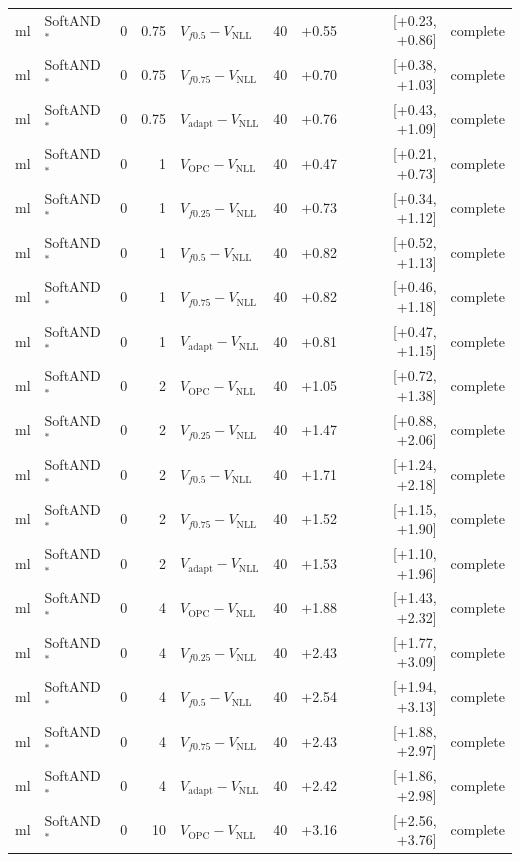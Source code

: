 \documentclass[10pt,a4paper]{article}
\begin{document}
{\begin{longtable}{llrrlrrrl}
ml & SoftAND$^*$ & 0 & 0.75 & $V_{f0.5}-V_{\mathrm{NLL}}$ & 40 & +0.55 & [+0.23, +0.86] & complete \\
ml & SoftAND$^*$ & 0 & 0.75 & $V_{f0.75}-V_{\mathrm{NLL}}$ & 40 & +0.70 & [+0.38, +1.03] & complete \\
ml & SoftAND$^*$ & 0 & 0.75 & $V_{\mathrm{adapt}}-V_{\mathrm{NLL}}$ & 40 & +0.76 & [+0.43, +1.09] & complete \\
ml & SoftAND$^*$ & 0 & 1 & $V_{\mathrm{OPC}}-V_{\mathrm{NLL}}$ & 40 & +0.47 & [+0.21, +0.73] & complete \\
ml & SoftAND$^*$ & 0 & 1 & $V_{f0.25}-V_{\mathrm{NLL}}$ & 40 & +0.73 & [+0.34, +1.12] & complete \\
ml & SoftAND$^*$ & 0 & 1 & $V_{f0.5}-V_{\mathrm{NLL}}$ & 40 & +0.82 & [+0.52, +1.13] & complete \\
ml & SoftAND$^*$ & 0 & 1 & $V_{f0.75}-V_{\mathrm{NLL}}$ & 40 & +0.82 & [+0.46, +1.18] & complete \\
ml & SoftAND$^*$ & 0 & 1 & $V_{\mathrm{adapt}}-V_{\mathrm{NLL}}$ & 40 & +0.81 & [+0.47, +1.15] & complete \\
ml & SoftAND$^*$ & 0 & 2 & $V_{\mathrm{OPC}}-V_{\mathrm{NLL}}$ & 40 & +1.05 & [+0.72, +1.38] & complete \\
ml & SoftAND$^*$ & 0 & 2 & $V_{f0.25}-V_{\mathrm{NLL}}$ & 40 & +1.47 & [+0.88, +2.06] & complete \\
ml & SoftAND$^*$ & 0 & 2 & $V_{f0.5}-V_{\mathrm{NLL}}$ & 40 & +1.71 & [+1.24, +2.18] & complete \\
ml & SoftAND$^*$ & 0 & 2 & $V_{f0.75}-V_{\mathrm{NLL}}$ & 40 & +1.52 & [+1.15, +1.90] & complete \\
ml & SoftAND$^*$ & 0 & 2 & $V_{\mathrm{adapt}}-V_{\mathrm{NLL}}$ & 40 & +1.53 & [+1.10, +1.96] & complete \\
ml & SoftAND$^*$ & 0 & 4 & $V_{\mathrm{OPC}}-V_{\mathrm{NLL}}$ & 40 & +1.88 & [+1.43, +2.32] & complete \\
ml & SoftAND$^*$ & 0 & 4 & $V_{f0.25}-V_{\mathrm{NLL}}$ & 40 & +2.43 & [+1.77, +3.09] & complete \\
ml & SoftAND$^*$ & 0 & 4 & $V_{f0.5}-V_{\mathrm{NLL}}$ & 40 & +2.54 & [+1.94, +3.13] & complete \\
ml & SoftAND$^*$ & 0 & 4 & $V_{f0.75}-V_{\mathrm{NLL}}$ & 40 & +2.43 & [+1.88, +2.97] & complete \\
ml & SoftAND$^*$ & 0 & 4 & $V_{\mathrm{adapt}}-V_{\mathrm{NLL}}$ & 40 & +2.42 & [+1.86, +2.98] & complete \\
ml & SoftAND$^*$ & 0 & 10 & $V_{\mathrm{OPC}}-V_{\mathrm{NLL}}$ & 40 & +3.16 & [+2.56, +3.76] & complete \\

\end{longtable}}
\end{document}
